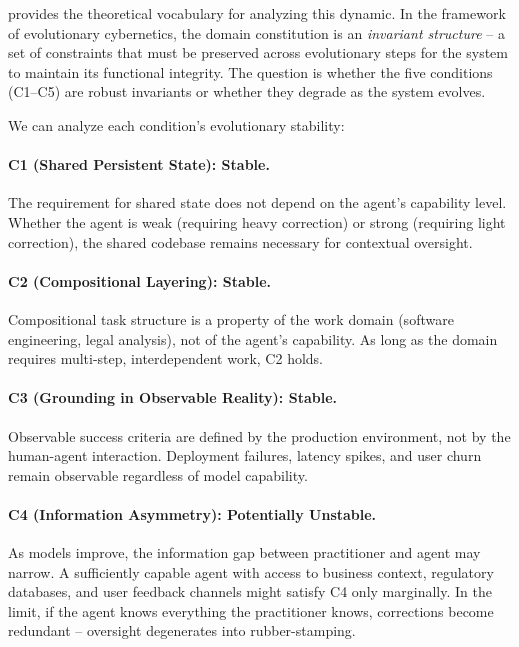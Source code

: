 \documentclass[11pt]{article}
\begin{document}
\citet{palagin2025evolutionary} provides the theoretical vocabulary for analyzing this dynamic.
In the framework of evolutionary cybernetics, the domain constitution is an \emph{invariant structure} -- a set of constraints that must be preserved across evolutionary steps for the system to maintain its functional integrity.
The question is whether the five conditions (C1--C5) are robust invariants or whether they degrade as the system evolves.

We can analyze each condition's evolutionary stability:

\paragraph{C1 (Shared Persistent State): Stable.}
The requirement for shared state does not depend on the agent's capability level.
Whether the agent is weak (requiring heavy correction) or strong (requiring light correction), the shared codebase remains necessary for contextual oversight.

\paragraph{C2 (Compositional Layering): Stable.}
Compositional task structure is a property of the work domain (software engineering, legal analysis), not of the agent's capability.
As long as the domain requires multi-step, interdependent work, C2 holds.

\paragraph{C3 (Grounding in Observable Reality): Stable.}
Observable success criteria are defined by the production environment, not by the human-agent interaction.
Deployment failures, latency spikes, and user churn remain observable regardless of model capability.

\paragraph{C4 (Information Asymmetry): Potentially Unstable.}
As models improve, the information gap between practitioner and agent may narrow.
A sufficiently capable agent with access to business context, regulatory databases, and user feedback channels might satisfy C4 only marginally.
In the limit, if the agent knows everything the practitioner knows, corrections become redundant -- oversight degenerates into rubber-stamping.
\end{document}
